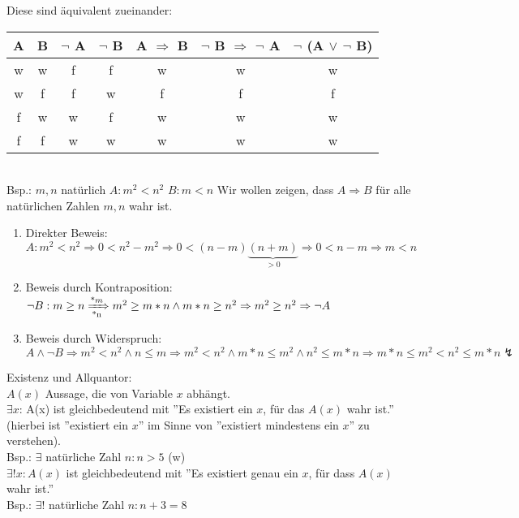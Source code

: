 \documentclass[10pt,a4paper,numbers=endperiod]{scrartcl}
\theoremstyle{definition}
\begin{document}
Diese sind äquivalent zueinander:\\

\begin{tabular}{c|c|c|c|c|c|c}
	A & B & $\neg$ A & $\neg$ B & A $\Rightarrow$ B & $\neg$ B $\Rightarrow$ $\neg$ A & $\neg$ (A $\vee$ $\neg$ B)\\
	\hline
	w & w & f & f & w & w & w \\
	w & f & f & w & f & f & f \\
	f & w & w & f & w & w & w \\
	f & f & w & w & w & w & w\\
\end{tabular} \\

Bsp.: 
$m,n$ natürlich 
$A: m^2<n^2$
$B: m<n$
Wir wollen zeigen, dass $A \Rightarrow B$  für alle natürlichen Zahlen $m,n$ wahr ist.

\begin{enumerate}
\item Direkter Beweis:\\
$A: m^2<n^2 \Rightarrow 0<n^2-m^2 \Rightarrow 0<(n-m)\underbrace{(n+m)}_{>0} \Rightarrow 0<n-m \Rightarrow m<n$ 
\item Beweis durch Kontraposition:\\
$\neg B: m \geq n \xRightarrow[\text{*n}]{\text *m} m^2 \geq m*n \wedge m*n \geq n^2 \Rightarrow m^2 \geq n^2 \Rightarrow \neg A$
\item Beweis durch Widerspruch:\\
$A \wedge \neg B \Rightarrow m^2<n^2 \wedge n \leq m \Rightarrow m^2<n^2 \wedge m*n \leq m^2 \wedge n^2 \leq m*n \Rightarrow m*n \leq m^2<n^2 \leq m*n   \lightning$
\end{enumerate}

Existenz und Allquantor:\\
$A(x)$ Aussage, die von Variable $x$ abhängt.\\
$\exists x$: A(x) ist gleichbedeutend mit ''Es existiert ein $x$, für das $A(x)$ wahr ist.'' (hierbei ist ''existiert ein $x$'' im Sinne von ''existiert mindestens ein $x$'' zu verstehen).\\
Bsp.: $\exists$ natürliche Zahl $n: n>5$ (w)\\

$\exists! x: A(x)$ ist gleichbedeutend mit ''Es existiert genau ein $x$, für dass $A(x)$ wahr ist.''\\
Bsp.: $\exists!$ natürliche Zahl $n: n+3=8$\\
\end{document}
